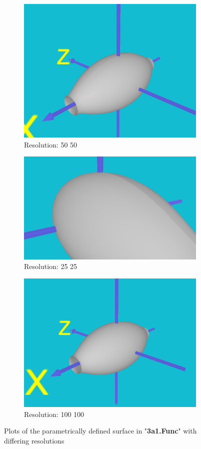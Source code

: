 \documentclass[acmlarge,nonacm=true]{acmart}
\begin{document}
\begin{figure}[H]
	\begin{subfigure}{.33\textwidth}
		\centering
		\includegraphics[width=.8\linewidth]{fig/3ai_50_50.PNG}
		\caption{Resolution: 50 50}
	\end{subfigure}%
	\begin{subfigure}{.33\textwidth}
		\centering
		\includegraphics[width=.8\linewidth]{fig/3ai_25_25.PNG}
		\caption{Resolution: 25 25}
	\end{subfigure}
	\begin{subfigure}{.33\textwidth}
			\centering
			\includegraphics[width=.8\linewidth]{fig/3ai_100_100.PNG}
			\caption{Resolution: 100 100}
	\end{subfigure}
	\caption{Plots of the parametrically defined surface in "\textbf{3a1.Func}" with differing resolutions}
	\label{fig:3a1}
\end{figure}
\end{document}
